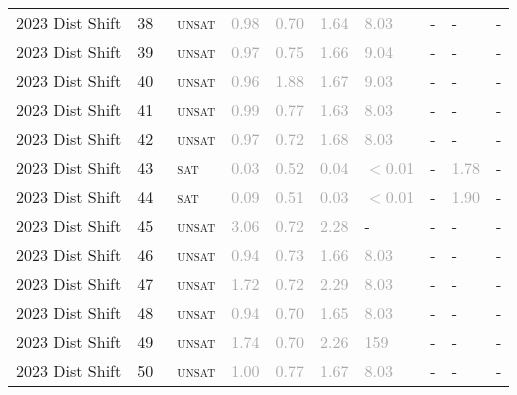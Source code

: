 \begin{center}
{\begin{longtable}{@{}llllllllll@{}}
2023 Dist Shift & 38 & ~\textsc{unsat} & \textcolor{darkgray}{0.98} & \textcolor{darkgray}{0.70} & \textcolor{darkgray}{1.64} & \textcolor{darkgray}{8.03} & - & - & - \\
2023 Dist Shift & 39 & ~\textsc{unsat} & \textcolor{darkgray}{0.97} & \textcolor{darkgray}{0.75} & \textcolor{darkgray}{1.66} & \textcolor{darkgray}{9.04} & - & - & - \\
2023 Dist Shift & 40 & ~\textsc{unsat} & \textcolor{darkgray}{0.96} & \textcolor{darkgray}{1.88} & \textcolor{darkgray}{1.67} & \textcolor{darkgray}{9.03} & - & - & - \\
2023 Dist Shift & 41 & ~\textsc{unsat} & \textcolor{darkgray}{0.99} & \textcolor{darkgray}{0.77} & \textcolor{darkgray}{1.63} & \textcolor{darkgray}{8.03} & - & - & - \\
2023 Dist Shift & 42 & ~\textsc{unsat} & \textcolor{darkgray}{0.97} & \textcolor{darkgray}{0.72} & \textcolor{darkgray}{1.68} & \textcolor{darkgray}{8.03} & - & - & - \\
2023 Dist Shift & 43 & ~\textsc{sat} & \textcolor{darkgray}{0.03} & \textcolor{darkgray}{0.52} & \textcolor{darkgray}{0.04} & \textcolor{darkgray}{$<$0.01} & - & \textcolor{darkgray}{1.78} & - \\
2023 Dist Shift & 44 & ~\textsc{sat} & \textcolor{darkgray}{0.09} & \textcolor{darkgray}{0.51} & \textcolor{darkgray}{0.03} & \textcolor{darkgray}{$<$0.01} & - & \textcolor{darkgray}{1.90} & - \\
2023 Dist Shift & 45 & ~\textsc{unsat} & \textcolor{darkgray}{3.06} & \textcolor{darkgray}{0.72} & \textcolor{darkgray}{2.28} & - & - & - & - \\
2023 Dist Shift & 46 & ~\textsc{unsat} & \textcolor{darkgray}{0.94} & \textcolor{darkgray}{0.73} & \textcolor{darkgray}{1.66} & \textcolor{darkgray}{8.03} & - & - & - \\
2023 Dist Shift & 47 & ~\textsc{unsat} & \textcolor{darkgray}{1.72} & \textcolor{darkgray}{0.72} & \textcolor{darkgray}{2.29} & \textcolor{darkgray}{8.03} & - & - & - \\
2023 Dist Shift & 48 & ~\textsc{unsat} & \textcolor{darkgray}{0.94} & \textcolor{darkgray}{0.70} & \textcolor{darkgray}{1.65} & \textcolor{darkgray}{8.03} & - & - & - \\
2023 Dist Shift & 49 & ~\textsc{unsat} & \textcolor{darkgray}{1.74} & \textcolor{darkgray}{0.70} & \textcolor{darkgray}{2.26} & \textcolor{darkgray}{159} & - & - & - \\
2023 Dist Shift & 50 & ~\textsc{unsat} & \textcolor{darkgray}{1.00} & \textcolor{darkgray}{0.77} & \textcolor{darkgray}{1.67} & \textcolor{darkgray}{8.03} & - & - & - \\

\end{longtable}}
\end{center}
